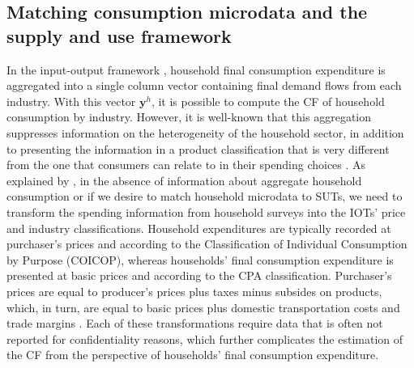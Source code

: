 \documentclass[
  10pt,
  twocolumn]{aft}
\begin{document}
\subsection{Matching consumption microdata and the supply and use
framework}\label{sec-method-household}

In the input-output framework
\citep{remond-tiedrez_eu_2019, undesa_handbook_2018}, household final
consumption expenditure is aggregated into a single column vector
containing final demand flows from each industry. With this vector
\(\textbf{y}^h\), it is possible to compute the CF of household
consumption by industry. However, it is well-known that this aggregation
suppresses information on the heterogeneity of the household sector, in
addition to presenting the information in a product classification that
is very different from the one that consumers can relate to in their
spending choices \citep{mongelli_integrating_2010}. As explained by
\citet{cazcarro_linking_2022}, in the absence of information about
aggregate household consumption or if we desire to match household
microdata to SUTs, we need to transform the spending information from
household surveys into the IOTs' price and industry classifications.
Household expenditures are typically recorded at purchaser's prices and
according to the Classification of Individual Consumption by Purpose
(COICOP), whereas households' final consumption expenditure is presented
at basic prices and according to the CPA classification. Purchaser's
prices are equal to producer's prices plus taxes minus subsides on
products, which, in turn, are equal to basic prices plus domestic
transportation costs and trade margins \citep{remond-tiedrez_eu_2019}.
Each of these transformations require data that is often not reported
for confidentiality reasons, which further complicates the estimation of
the CF from the perspective of households' final consumption
expenditure.
\end{document}
